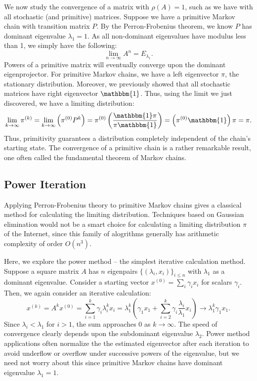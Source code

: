 \documentclass[12pt]{article}
\newcommand{\iterate}[2]{#1^{(#2)}}
\newcommand{\parens}[1]{ \left( #1 \right) }
\begin{document}
We now study the convergence of a matrix with $\rho(A) = 1$, such as we have
with all stochastic (and primitive) matrices. Suppose we have a primitive Markov
chain with transition matrix $P$. By the Perron-Frobenius theorem, we know $P$
has dominant eigenvalue $\lambda_1 = 1$. As all non-dominant eigenvalues have
modulus less than 1, we simply have the following:
\begin{equation*}
  \lim_{n\to\infty}{A^n} = E_{\lambda_1}.
\end{equation*}
Powers of a primitive matrix will eventually converge upon the dominant
eigenprojector. For primitive Markov chains, we have a left eigenvector $\pi$,
the stationary distribution. Moreover, we previously showed that all stochastic
matrices have right eigenvector $\mathbbm{1}$. Thus, using the limit we just
discovered, we have a limiting distribution:
\begin{equation}
  \lim_{k\to\infty}{{\iterate{\pi}{k}}} = \lim_{k\to\infty}{\parens{{\iterate{\pi}{0}} P^k}} = \iterate{\pi}{0} \parens{\frac{\mathbbm{1} \pi}{\pi \mathbbm{1}}} = \parens{\iterate{\pi}{0} \mathbbm{1}} \pi = \pi.
\end{equation}
Thus, primitivity guarantees a distribution completely independent of the
chain's starting state. The convergence of a primitive chain is a rather
remarkable result, one often called the fundamental theorem of Markov chains.


\subsection{Power Iteration}
Applying Perron-Frobenius theory to primitive Markov chains gives a classical
method for calculating the limiting distribution. Techniques based on Gaussian
elimination would not be a smart choice for calculating a limiting distribution
$\pi$ of the Internet, since this family of alogrithms generally has arithmetic
complexity of order $O(n^3)$.

Here, we explore the power method -- the simplest iterative calculation method.
Suppose a square matrix $A$ has $n$ eigenpairs $\{ (\lambda_i,x_i) \}_{i\leq n}$
with $\lambda_1$ as a dominant eigenvalue. Consider a starting vector
$x^{(0)}=\sum_i{\gamma_i x_i}$ for scalars $\gamma_i$. Then, we again consider
an iterative calculation:
\begin{equation}
  \iterate{x}{k} = A^k \iterate{x}{0} = \sum_{i=1}^{k}{\gamma_i \lambda_i^k x_i} = \lambda_1^k\parens{\gamma_1 x_1 + \sum_{i=2}^{k}{\gamma_i \frac{\lambda_i}{\lambda_1} x_i}} \to \lambda_1^k \gamma_1 x_1.
\end{equation}
Since $\lambda_i<\lambda_1$ for $i>1$, the sum approaches 0 as $k\to\infty$. The
speed of convergence clearly depends upon the subdominant eigenvalue
$\lambda_2$. Power method applications often normalize the the estimated
eigenvector after each iteration to avoid underflow or overflow under successive
powers of the eigenvalue, but we need not worry about this since primitive
Markov chains have dominant eigenvalue $\lambda_1 = 1$.
\end{document}
